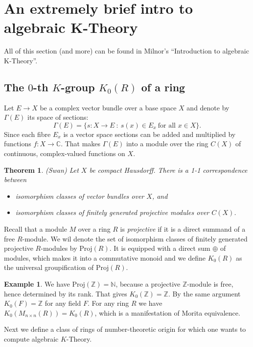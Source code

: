 \documentclass[a4paper,10pt]{article}
\theoremstyle{plain}%
\newtheorem{thm}{Theorem}
\theoremstyle{definition}
\newtheorem{exmp}{Example}
\theoremstyle{remark}
\newcommand{\NN}{\mathbb{N}}
\newcommand{\ZZ}{\mathbb{Z}}
\newcommand{\CC}{\mathbb{C}}
\newcommand{\proj}{\mathrm{Proj}}
\begin{document}
\section{An extremely brief intro to algebraic K-Theory}
All of this section (and more) can be found in Milnor's ``Introduction to algebraic K-Theory''.

\subsection{The $0$-th $K$-group $K_0(R)$ of a ring}

Let $E\to X$ be a complex vector bundle over a base space $X$ and denote by $\Gamma(E)$ its space of sections:
$$\Gamma(E)=\{s:X\to E~:~s(x)\in E_x\ \text{for all $x\in X$}\}.$$
Since each fibre $E_x$ is a vector space sections can be added and multiplied by functions $f:X\to\CC$. That makes $\Gamma(E)$ into a module over the ring $C(X)$ of continuous, complex-valued functions on $X$.

\begin{thm}
(Swan) Let $X$ be compact Hausdorff. There is a 1-1 correspondence between 
\begin{itemize}
\item isomorphism classes of vector bundles over $X$, and
\item isomorphism classes of finitely generated projective modules over $C(X)$.
\end{itemize}
\end{thm}

Recall that a module $M$ over a ring $R$ is \emph{projective} if it is a direct summand of a free $R$-module. We wil denote the set of isomorphism classes of finitely generated projective $R$-modules by $\proj(R)$. It is equipped with a direct sum $\oplus$ of modules, which makes it into a commutative monoid and we define $K_0(R)$ as the universal groupification of $\proj(R)$.

\begin{exmp}
We have $\proj(\ZZ)=\NN$, because a projective $\ZZ$-module is free, hence determined by its rank. That gives $K_0(\ZZ)=\ZZ$. By the same argument $K_0(F)=\ZZ$ for any field $F$. For any ring $R$ we have $K_0(M_{n\times n}(R))=K_0(R)$, which is a manifestation of Morita equivalence.
\end{exmp}

Next we define a class of rings of number-theoretic origin for which one wants to compute algebraic $K$-Theory.
\end{document}
